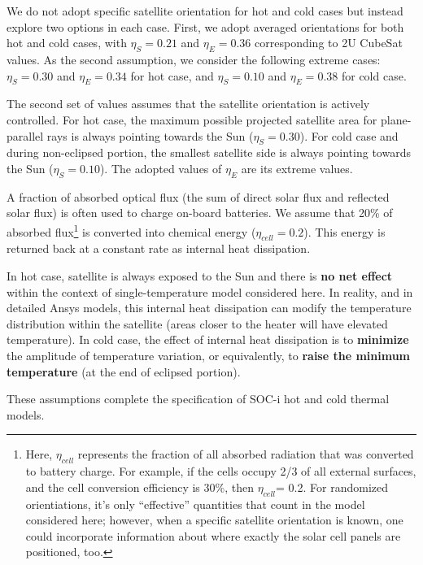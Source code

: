 \documentclass[]{aastex62}
\begin{document}
We do not adopt specific satellite orientation for hot and cold cases but instead explore two 
options in each case.  First, we adopt averaged orientations for both hot and cold cases,
with $\eta_S = 0.21$ and $\eta_E = 0.36$ corresponding to 2U CubeSat values. As the second 
assumption, we consider the following extreme cases: $\eta_S = 0.30$ and $\eta_E = 0.34$ for 
hot case, and $\eta_S = 0.10$ and $\eta_E = 0.38$ for cold case.  
 
The second set of values assumes that the satellite orientation is actively controlled.  For hot
case, the maximum possible projected satellite area for plane-parallel rays is always pointing 
towards the Sun ($\eta_S = 0.30$). For cold case and during non-eclipsed portion, the smallest 
satellite side is always pointing towards the Sun ($\eta_S = 0.10$).  The adopted values of 
$\eta_E$ are its extreme values. 

 
\vskip 0.1in 


A fraction of absorbed optical flux (the sum of direct solar flux and reflected solar flux) is often 
used to charge on-board batteries. We assume that 20\% of absorbed flux\footnote{Here, $\eta_{cell}$ 
represents the fraction of all absorbed radiation that was converted to battery charge. For example, if 
the cells occupy 2/3 of all external surfaces, and the cell conversion efficiency is 30\%, then $\eta_{cell}$= 0.2. 
For randomized orientiations, it's only ``effective'' quantities that count in the model considered here; 
however, when a specific satellite orientation is known, one could incorporate information about where 
exactly the solar cell panels are positioned, too.} is converted into chemical
energy ($\eta_{cell}=0.2$). This energy is returned back at a constant rate as internal heat dissipation. 

In hot case, satellite is always exposed to the Sun and there is {\bf no net effect} within the context
of single-temperature model considered here. In reality, and in detailed Ansys models, this
internal heat dissipation can modify the temperature distribution within the satellite (areas closer
to the heater will have elevated temperature). In cold case, the effect of internal heat dissipation
is to {\bf minimize} the amplitude of temperature variation, or equivalently, to {\bf raise the minimum
temperature} (at the end of eclipsed portion). 
 
These assumptions complete the specification of SOC-i hot and cold thermal models.  
\end{document}
